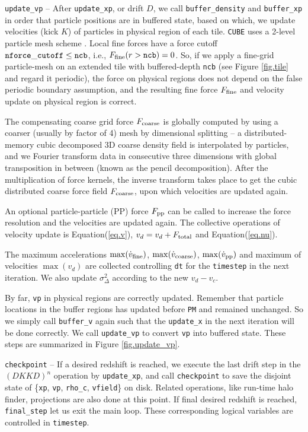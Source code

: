 \documentclass[10pt,twocolumn,preprint]{emulateapj}
\begin{document}
{\tt update\_vp} -- 
After {\tt update\_xp}, or drift $D$, we call {\tt buffer\_density} and {\tt buffer\_xp} in order that particle positions are in buffered state, based on which, we update velocities (kick $K$) of particles in physical region of each tile. {\tt CUBE} uses a 2-level particle mesh scheme \citep{2013MNRAS.436..540H}. Local fine forces have a force cutoff ${\tt nforce\_cutoff}\leq{\tt ncb}$, i.e., $F_{\rm fine}(r>{\tt ncb})=0$. So, if we apply a fine-grid particle-mesh on an extended tile with buffered-depth {\tt ncb} (see Figure \ref{fig.tile} and regard it periodic), the force on physical regions does not depend on the false periodic boundary assumption, and the resulting fine force $F_{\rm fine}$ and velocity update on physical region is correct.


The compensating coarse grid force $F_{\rm coarse}$ is globally computed by using a coarser (usually by factor of 4) mesh by dimensional splitting -- a distributed-memory cubic decomposed 3D coarse density field is interpolated by particles, and we Fourier transform data in consecutive three dimensions with global transposition in between (known as the pencil decomposition). After the multiplication of force kernels, the inverse transform takes place to get the cubic distributed coarse force field $F_{\rm coarse}$, upon which velocities are updated again.

An optional particle-particle (PP) force $F_{\rm pp}$ can be called to increase the force resolution and the velocities are updated again. The collective operations of velocity update is Equation(\ref{eq.v}), $v_d=v_d+F_{\rm total}$ and Equation(\ref{eq.nu}).

The maximum accelerations $\max(\dot{v}_{\rm fine})$, $\max(\dot{v}_{\rm coarse})$, $\max(\dot{v}_{\rm pp})$ and maximum of velocities $\max(v_d)$ are collected controlling {\tt dt} for the {\tt timestep} in the next iteration. We also update $\sigma^2_{\Delta}$ according to the new $v_d-v_c$.

By far, {\tt vp} in physical regions are correctly updated. Remember that particle locations in the buffer regions has updated before {\tt PM} and remained unchanged. So we simply call {\tt buffer\_v} again such that the {\tt update\_x} in the next iteration will be done correctly. We call {\tt update\_vp} to convert {\tt vp} into buffered state. These steps are summarized in Figure \ref{fig.update_vp}.

{\tt checkpoint} -- 
If a desired redshift is reached, we execute the last drift step in the $(DKKD)^n$ operation by {\tt update\_xp}, and call {\tt checkpoint} to save the disjoint state of \{{\tt xp}, {\tt vp}, {\tt rho\_c}, {\tt vfield}\} on disk. Related operations, like run-time halo finder, projections are also done at this point. If final desired redshift is reached, {\tt final\_step} let us exit the main loop. These corresponding logical variables are controlled in {\tt timestep}.
\end{document}
